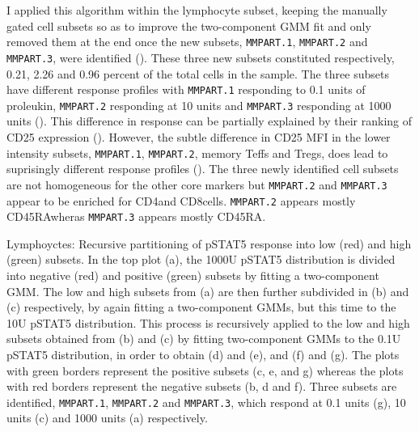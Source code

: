I applied this algorithm within the lymphocyte subset, keeping the manually gated cell subsets so as to improve the two-component GMM fit and only removed them at the end once the new subsets, \texttt{MMPART.1}, \texttt{MMPART.2} and \texttt{MMPART.3}, were identified ().
These three new subsets constituted respectively, 0.21, 2.26 and 0.96 percent of the total cells in the sample.
The three subsets have different response profiles with \texttt{MMPART.1} responding to 0.1 units of proleukin, \texttt{MMPART.2} responding at 10 units and \texttt{MMPART.3} responding at 1000 units ().
This difference in response can be partially explained by their ranking of CD25 expression ().
However, the subtle difference in CD25 MFI in the lower intensity subsets, \texttt{MMPART.1}, \texttt{MMPART.2}, memory Teffs and Tregs, does lead to suprisingly different response profiles ().
The three newly identified cell subsets are not homogeneous for the other core markers but \texttt{MMPART.2} and \texttt{MMPART.3} appear to be enriched for CD4\negative and CD8\positive cells.
\texttt{MMPART.2} appears mostly CD45RA\negative wheras \texttt{MMPART.3} appears mostly CD45RA\positive.


%
{ Lymphoyctes: Recursive partitioning of pSTAT5 response into low (red) and high (green) subsets. }
{
    In the top plot (a), the 1000U pSTAT5 distribution is divided into negative (red) and positive (green) subsets by fitting a two-component \gls{GMM}.
    The low and high subsets from (a) are then further subdivided in (b) and (c) respectively, by again fitting a two-component \glspl{GMM},
    but this time to the 10U pSTAT5 distribution.
    This process is recursively applied to the low and high subsets obtained from (b) and (c) by fitting two-component \glspl{GMM} to the 0.1U pSTAT5 distribution, in order
    to obtain (d) and (e), and (f) and (g).
    The plots with green borders represent the positive subsets (c, e, and g) whereas the plots with red borders represent the negative subsets (b, d and f).
    Three subsets are identified, \texttt{MMPART.1}, \texttt{MMPART.2} and \texttt{MMPART.3}, which respond at 0.1 units (g), 10 units (c) and 1000 units (a) respectively.
}

